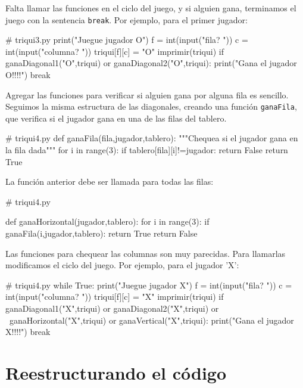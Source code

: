 Falta llamar las funciones en el ciclo del juego, y si alguien gana,
terminamos el juego con la sentencia \texttt{break}. Por ejemplo,
para el primer jugador:

\begin{pythoncode}
# triqui3.py
print("Juegue jugador O")
    f = int(input("fila? "))
    c = int(input("columna? "))
    triqui[f][c] = "O"
    imprimir(triqui)
    if ganaDiagonal1("O",triqui) or ganaDiagonal2("O",triqui):
        print("Gana el jugador O!!!!")
        break
\end{pythoncode}

Agregar las funciones para verificar si alguien gana por alguna fila
es sencillo. Seguimos la misma estructura de las diagonales, creando
una función \texttt{ganaFila}, que verifica si el jugador gana en
una de las filas del tablero.

\begin{pythoncode}
# triqui4.py
def ganaFila(fila,jugador,tablero):
    """Chequea si el jugador gana en la fila dada"""
    for i in range(3):
        if tablero[fila][i]!=jugador:
            return False
    return True
\end{pythoncode}

La función anterior debe ser llamada para todas las filas:

\begin{pythoncode}
# triqui4.py

def ganaHorizontal(jugador,tablero):
    for i in range(3):
        if ganaFila(i,jugador,tablero):
            return True
    return False
\end{pythoncode}

Las funciones para chequear las columnas son muy parecidas. Para llamarlas
modificamos el ciclo del juego. Por ejemplo, para el jugador 'X':

\begin{pythoncode}
# triqui4.py
while True:
    print("Juegue jugador X")
    f = int(input("fila? "))
    c = int(input("columna? "))
    triqui[f][c] = "X"
    imprimir(triqui)
    if ganaDiagonal1("X",triqui) or ganaDiagonal2("X",triqui) or \
       ganaHorizontal("X",triqui) or ganaVertical("X",triqui):
        print("Gana el jugador X!!!!")
        break
\end{pythoncode}

\section{Reestructurando el código}

